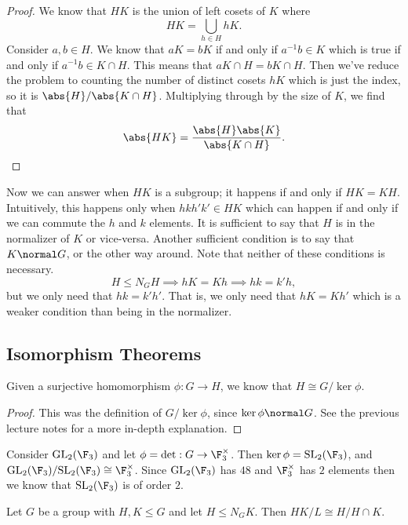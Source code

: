 \begin{proof}
We know that $HK$ is the union of left cosets of $K$ where 
\[ HK = \bigcup_{h \in H} hK. \]
Consider $a,b \in H$. We know that $aK = bK$ if and only if $a^{-1}b \in K$ which is true if and only if $a^{-1}b \in K \cap H$. This means that $a K \cap H = b K \cap H$. Then we've reduce the problem to counting the number of distinct cosets $hK$ which is just the index, so it is $\abs{H} / \abs{K \cap H}$. Multiplying through by the size of $K$, we find that 
\[ \abs{HK} = \frac{\abs{H}\abs{K}}{\abs{K \cap H}}.\qedhere \]
\end{proof}

Now we can answer when $HK$ is a subgroup; it happens if and only if $HK = KH$. Intuitively, this happens only when $hkh'k' \in HK$ which can happen if and only if we can commute the $h$ and $k$ elements. It is sufficient to say that $H$ is in the normalizer of $K$ or vice-versa. Another sufficient condition is to say that $K \normal G$, or the other way around. Note that neither of these conditions is necessary. 
\[ H \leq N_G H \implies hK = Kh \implies hk = k'h, \]
but we only need that $hk = k'h'$. That is, we only need that $hK = Kh'$ which is a weaker condition than being in the normalizer.

\subsection{Isomorphism Theorems}

\begin{theorem}
Given a surjective homomorphism $\phi : G \to H$, we know that $H \cong G/\ker\phi$.
\end{theorem}
\begin{proof}
This was the definition of $G / \ker\phi$, since $\ker\phi \normal G$. See the previous lecture notes for a more in-depth explanation.
\end{proof}

\begin{example}
Consider $\mathrm{GL}_2(\F_3)$ and let $\phi = \det : G \to \F_3^\times$. Then $\ker \phi = \mathrm{SL}_2(\F_3)$, and $\mathrm{GL}_2(\F_3) / \mathrm{SL}_2(\F_3) \cong \F_3^\times$. Since $\mathrm{GL}_2(\F_3)$ has $48$ and $\F_3^\times$ has $2$ elements then we know that $\mathrm{SL}_2(\F_3)$ is of order $2$.
\end{example}

\begin{theorem}
Let $G$ be a group with $H,K \leq G$ and let $H \leq N_GK$. Then $HK / L \cong H/H\cap K$.
\end{theorem}

